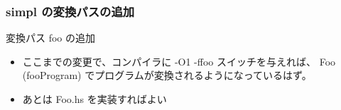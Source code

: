 \documentclass[cjk,dvipdfm,14pt]{beamer}
\begin{document}
\begin{frame}[fragile]
\frametitle{simpl の変換パスの追加}

変換パス foo の追加

\hrulefill

\begin{itemize}
\item ここまでの変更で、コンパイラに -O1 -ffoo スイッチを与えれば、
Foo (fooProgram) でプログラムが変換されるようになっているはず。
\item あとは Foo.hs を実装すればよい
\end{itemize}

\end{frame}


\begin{frame}[fragile]
\frametitle{}
\end{frame}

\begin{frame}[fragile]
\frametitle{}
\end{frame}

\begin{frame}[fragile]
\frametitle{}
\end{frame}

\begin{frame}[fragile]
\frametitle{}
\end{frame}








\end{document}

